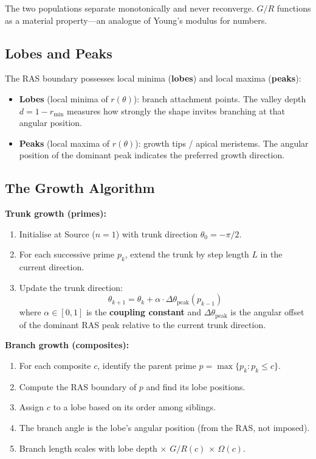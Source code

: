 \documentclass[11pt,a4paper]{article}
\begin{document}
The two populations separate monotonically and never reconverge. $G\!/\!R$ functions as a material property---an analogue of Young's modulus for numbers.

\subsection{Lobes and Peaks}

The RAS boundary possesses local minima (\textbf{lobes}) and local maxima (\textbf{peaks}):
\begin{itemize}[nosep]
    \item \textbf{Lobes} (local minima of $r(\theta)$): branch attachment points. The valley depth $d = 1 - r_{\min}$ measures how strongly the shape invites branching at that angular position.
    \item \textbf{Peaks} (local maxima of $r(\theta)$): growth tips / apical meristems. The angular position of the dominant peak indicates the preferred growth direction.
\end{itemize}

\subsection{The Growth Algorithm}

\textbf{Trunk growth (primes):}
\begin{enumerate}[nosep]
    \item Initialise at Source ($n = 1$) with trunk direction $\theta_0 = -\pi/2$.
    \item For each successive prime $p_k$, extend the trunk by step length $L$ in the current direction.
    \item Update the trunk direction:
    \begin{equation}
        \theta_{k+1} = \theta_k + \alpha \cdot \Delta\theta_{\mathrm{peak}}(p_{k-1})
        \label{eq:trunk}
    \end{equation}
    where $\alpha \in [0,1]$ is the \textbf{coupling constant} and $\Delta\theta_{\mathrm{peak}}$ is the angular offset of the dominant RAS peak relative to the current trunk direction.
\end{enumerate}

\textbf{Branch growth (composites):}
\begin{enumerate}[nosep]
    \item For each composite $c$, identify the parent prime $p = \max\{p_k : p_k \leq c\}$.
    \item Compute the RAS boundary of $p$ and find its lobe positions.
    \item Assign $c$ to a lobe based on its order among siblings.
    \item The branch angle is the lobe's angular position (from the RAS, not imposed).
    \item Branch length scales with lobe depth $\times$ $G\!/\!R(c)$ $\times$ $\Omega(c)$.
\end{enumerate}
\end{document}
